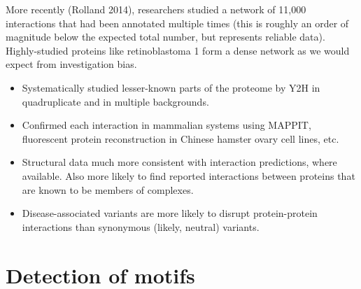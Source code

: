 \documentclass{article}
\begin{document}
More recently (Rolland 2014), researchers studied a network of 11,000 interactions that had been annotated multiple times (this is roughly an order of magnitude below the expected total number, but represents reliable data). Highly-studied proteins like retinoblastoma 1 form a dense network as we would expect from investigation bias.

\begin{itemize}
\item Systematically studied lesser-known parts of the proteome by Y2H in quadruplicate and in multiple backgrounds.
\item Confirmed each interaction in mammalian systems using MAPPIT, fluorescent protein reconstruction in Chinese hamster ovary cell lines, etc.
\item Structural data much more consistent with interaction predictions, where available. Also more likely to find reported interactions between proteins that are known to be members of complexes.
\item Disease-associated variants are more likely to disrupt protein-protein interactions than synonymous (likely, neutral) variants.
\end{itemize}


\section*{Detection of motifs}
\end{document}
